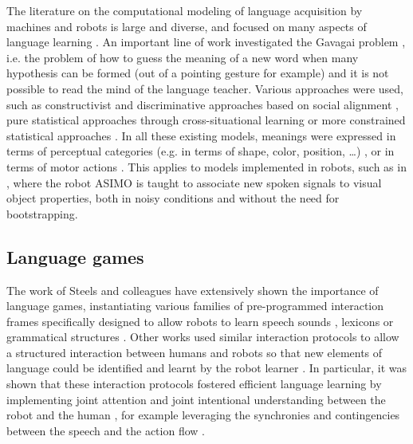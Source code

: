 The literature on the computational modeling of language acquisition by machines and robots is large and diverse, and focused on many aspects of language learning \cite{steels2012grounding,steels2002aibos, cangelosi2010integration, kaplan2008computational, steels2003evolving, brent1997computational, yu2007unified}. An important line of work investigated the Gavagai problem \cite{quine1964word}, i.e. the problem of how to guess the meaning of a new word when many hypothesis can be formed (out of a pointing gesture for example) and it is not possible to read the mind of the language teacher. Various approaches were used, such as constructivist and discriminative approaches based on social alignment \cite{steels06spatialLanguage, steels2008can}, pure statistical approaches through cross-situational learning \cite{xu2007word, smith2008infants} or more constrained statistical approaches \cite{roy2005semiotic, yu2007unified}. In all these existing models, meanings were expressed in terms of perceptual categories (e.g. in terms of shape, color, position, \ldots) \cite{steels06spatialLanguage, steels2008can,yu2007unified}, or in terms of motor actions \cite{steels2008robot, Massera2010,sugita05a}. This applies to models implemented in robots, such as in \cite{heckmann2009teaching}, where the robot ASIMO is taught to associate new spoken signals to visual object properties, both in noisy conditions and without the need for bootstrapping. 

\subsection{Language games}

The work of Steels and colleagues \cite{steels2012grounding,steels2002aibos} have extensively shown the importance of  language games, instantiating various families of pre-programmed interaction frames specifically designed to allow robots to learn speech sounds \cite{de2000self,oudeyer2006self}, lexicons \cite{steels2002aibos} or grammatical structures \cite{steels06spatialLanguage, steels2008can}. Other works used similar interaction protocols to allow a structured interaction between humans and robots so that new elements of language could be identified and learnt by the robot learner \cite{roy02a,lyon2012interactive,cangelosi06b,yu2004multimodal,cangelosi2010integration,sugita05a,dominey2005learning,cederborg2011imitating}. In particular, it was shown that these interaction protocols fostered efficient language learning by implementing joint attention and joint intentional understanding between the robot and the human \cite{kaplan2006challenges,yu2005role,yu2007unified}, for example leveraging the synchronies and contingencies between the speech and the action flow \cite{rohlfing2006can,schillingmann2011acoustic}.

